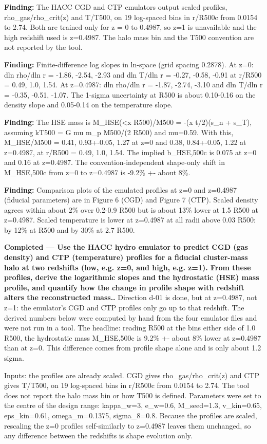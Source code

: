 \documentclass[11pt,a4paper]{article}
\begin{document}
\textbf{Finding:} The HACC CGD and CTP emulators output scaled profiles, rho\_gas/rho\_crit(z) and T/T500, on 19 log-spaced bins in r/R500c from 0.0154 to 2.74. Both are trained only for z = 0 to 0.4987, so z=1 is unavailable and the high redshift used is z=0.4987. The halo mass bin and the T500 convention are not reported by the tool.

\textbf{Finding:} Finite-difference log slopes in ln-space (grid spacing 0.2878). At z=0: dln rho/dln r = -1.86, -2.54, -2.93 and dln T/dln r = -0.27, -0.58, -0.91 at r/R500 = 0.49, 1.0, 1.54. At z=0.4987: dln rho/dln r = -1.87, -2.74, -3.10 and dln T/dln r = -0.35, -0.51, -1.07. The 1-sigma uncertainty at R500 is about 0.10-0.16 on the density slope and 0.05-0.14 on the temperature slope.

\textbf{Finding:} The HSE mass is M\_HSE(\textless{}x R500)/M500 = -(x t/2)(s\_n + s\_T), assuming kT500 = G mu m\_p M500/(2 R500) and mu=0.59. With this, M\_HSE/M500 = 0.41, 0.93+-0.05, 1.27 at z=0 and 0.38, 0.84+-0.05, 1.22 at z=0.4987, at r/R500 = 0.49, 1.0, 1.54. The implied b\_HSE,500c is 0.075 at z=0 and 0.16 at z=0.4987. The convention-independent shape-only shift in M\_HSE,500c from z=0 to z=0.4987 is -9.2\% +- about 8\%.

\textbf{Finding:} Comparison plots of the emulated profiles at z=0 and z=0.4987 (fiducial parameters) are in Figure 6 (CGD) and Figure 7 (CTP). Scaled density agrees within about 2\% over 0.2-0.9 R500 but is about 13\% lower at 1.5 R500 at z=0.4987. Scaled temperature is lower at z=0.4987 at all radii above 0.03 R500: by 12\% at R500 and by 30\% at 2.7 R500.

\textbf{Completed --- Use the HACC hydro emulator to predict CGD (gas density) and CTP (temperature) profiles for a fiducial cluster-mass halo at two redshifts (low, e.g. z=0, and high, e.g. z=1). From these profiles, derive the logarithmic slopes and the hydrostatic (HSE) mass profile, and quantify how the change in profile shape with redshift alters the reconstructed mass..} Direction d-01 is done, but at z=0.4987, not z=1: the emulator's CGD and CTP profiles only go up to that redshift. The derived numbers below were computed by hand from the four emulator files and were not run in a tool. The headline: reading R500 at the bins either side of 1.0 R500, the hydrostatic mass M\_HSE,500c is 9.2\% +- about 8\% lower at z=0.4987 than at z=0. This difference comes from profile shape alone and is only about 1.2 sigma.

Inputs: the profiles are already scaled. CGD gives rho\_gas/rho\_crit(z) and CTP gives T/T500, on 19 log-spaced bins in r/R500c from 0.0154 to 2.74. The tool does not report the halo mass bin or how T500 is defined. Parameters were set to the centre of the design range: kappa\_w=3, e\_w=0.6, M\_seed=1.3, v\_kin=0.65, eps\_kin=0.61, omega\_m=0.1375, sigma\_8=0.8. Because the profiles are scaled, rescaling the z=0 profiles self-similarly to z=0.4987 leaves them unchanged, so any difference between the redshifts is shape evolution only.
\end{document}

